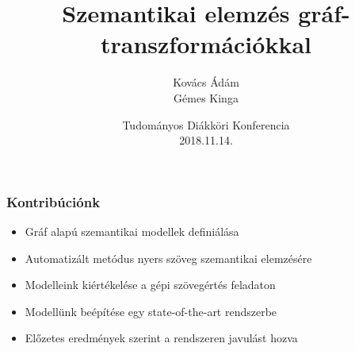 \documentclass[bigger]{beamer}
\begin{document}
\title{Szemantikai elemz\'es gr\'af-transzform\'aci\'okkal}
\author{Kov\'acs \'Ad\'am \\ G\'emes Kinga}

\date{Tudományos Diákköri Konferencia\\2018.11.14.}


\begin{frame} 

\titlepage 

\end{frame} 


\begin{frame} 

    \frametitle{Kontribúciónk} 
    \begin{itemize}
        \pause \item Gráf alapú szemantikai modellek definiálása
        \pause \item Automatizált metódus nyers szöveg szemantikai elemzésére
        \pause \item Modelleink kiértékelése a gépi szövegértés feladaton
        \pause \item Modellünk beépítése egy state-of-the-art rendszerbe
        \pause \item Előzetes eredmények szerint a rendszeren javulást hozva
    \end{itemize}

\end{frame} 

\end{document}
